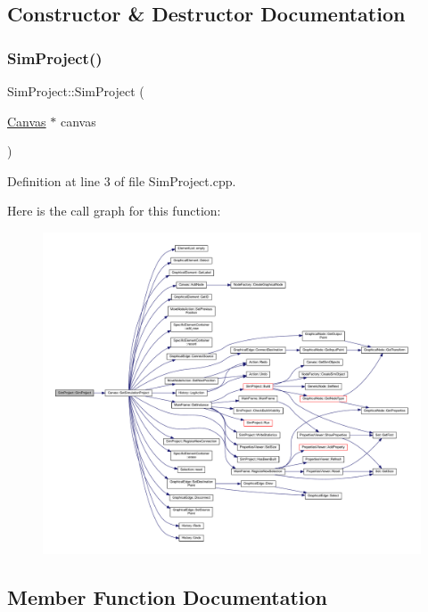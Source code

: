 \subsection{Constructor \& Destructor Documentation}
\mbox{\label{class_sim_project_a970fe219d4659b02bf5e870a69351399}} 
\subsubsection{\texorpdfstring{Sim\+Project()}{SimProject()}}
{\footnotesize\ttfamily Sim\+Project\+::\+Sim\+Project (\begin{DoxyParamCaption}\item[{\hyperlink{class_canvas}{Canvas} $\ast$}]{canvas }\end{DoxyParamCaption})}



Definition at line 3 of file Sim\+Project.\+cpp.

Here is the call graph for this function\+:
\nopagebreak
\begin{figure}[H]
\begin{center}
\leavevmode
\includegraphics[width=350pt]{class_sim_project_a970fe219d4659b02bf5e870a69351399_cgraph}
\end{center}
\end{figure}


\subsection{Member Function Documentation}
\mbox{\label{class_sim_project_afefd1eb6d63ea4e0c698084d51a29fcd}} 
